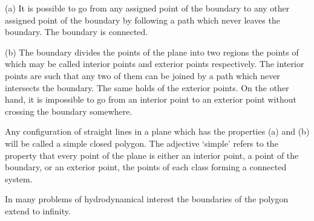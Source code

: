 \documentclass[a4paper]{article}
\begin{document}
(a) It is possible to go from any assigned point of the boundary to any other assigned point of the boundary by following a
path which never leaves the boundary. The boundary is connected.

(b) The boundary divides the points of the plane into two regions the points of which may be called interior points and
exterior points respectively. The interior points are such that any two of them can be joined by a path which never intersects
the boundary. The same holds of the exterior points. On the other hand, it is impossible to go from an interior point to an
exterior point without crossing the boundary somewhere.

Any configuration of straight lines in a plane which has the properties (a) and (b) will be called a simple closed polygon.
The adjective `simple' refers to the property that every point of the plane is either an interior point, a point of the
boundary, or an exterior point, the points of each class forming a connected system.

In many problems of hydrodynamical interest the boundaries of the polygon extend to infinity.
\end{document}
